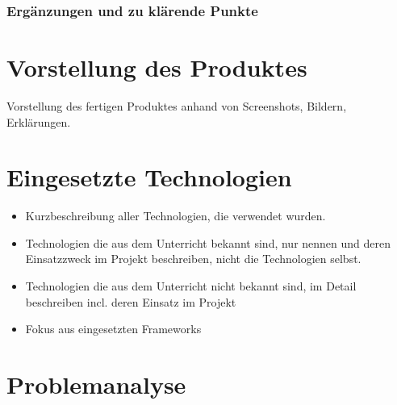 \subsection{Ergänzungen und zu klärende Punkte}

\chapter{Vorstellung des Produktes}
Vorstellung des fertigen Produktes anhand von Screenshots, Bildern, Erklärungen.

\chapter{Eingesetzte Technologien}
\begin{itemize}
	\item Kurzbeschreibung aller Technologien, die verwendet wurden.
	\item Technologien die aus dem Unterricht bekannt sind, nur nennen und deren  Einsatzzweck im Projekt beschreiben, nicht die Technologien selbst.
	\item Technologien die aus dem Unterricht nicht bekannt sind, im Detail beschreiben incl. deren Einsatz im Projekt
	\item Fokus aus eingesetzten Frameworks
\end{itemize}

\chapter{Problemanalyse}
